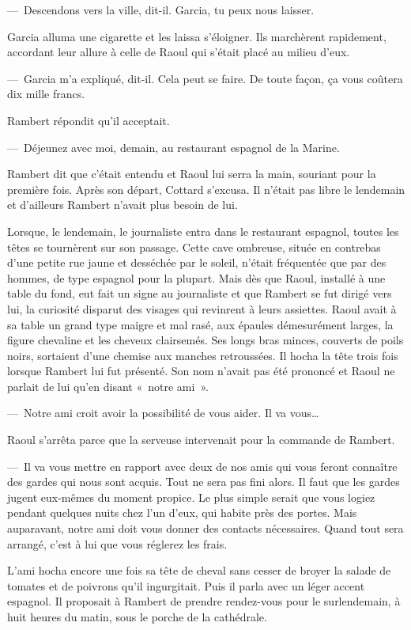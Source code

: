 \documentclass[french,twoside]{book} %
\begin{document}
— Descendons vers la ville, dit-il. Garcia, tu peux nous laisser.\par
Garcia alluma une cigarette et les laissa s’éloigner. Ils marchèrent rapidement, accordant leur allure à celle de Raoul qui s’était placé au milieu d’eux.\par
— Garcia m’a expliqué, dit-il. Cela peut se faire. De toute façon, ça vous coûtera dix mille francs.\par
Rambert répondit qu’il acceptait.\par
— Déjeunez avec moi, demain, au restaurant espagnol de la Marine.\par
Rambert dit que c’était entendu et Raoul lui serra la main, souriant pour la première fois. Après son départ, Cottard s’excusa. Il n’était pas libre le lendemain et d’ailleurs Rambert n’avait plus besoin de lui.\par
Lorsque, le lendemain, le journaliste entra dans le restaurant espagnol, toutes les têtes se tournèrent sur son passage. Cette cave ombreuse, située en contrebas d’une petite rue jaune et desséchée par le soleil, n’était fréquentée que par des hommes, de type espagnol pour la plupart. Mais dès que Raoul, installé à une table du fond, eut fait un signe au journaliste et que Rambert se fut dirigé vers lui, la curiosité disparut des visages qui revinrent à leurs assiettes. Raoul avait à sa table un grand type maigre et mal rasé, aux épaules démesurément larges, la figure chevaline et les cheveux clairsemés. Ses longs bras minces, couverts de poils noirs, sortaient d’une chemise aux manches retroussées. Il hocha la tête trois fois lorsque Rambert lui fut présenté. Son nom n’avait pas été prononcé et Raoul ne parlait de lui qu’en disant « notre ami ».\par
— Notre ami croit avoir la possibilité de vous aider. Il va vous…\par
Raoul s’arrêta parce que la serveuse intervenait pour la commande de Rambert.\par
— Il va vous mettre en rapport avec deux de nos amis qui vous feront connaître des gardes qui nous sont acquis. Tout ne sera pas fini alors. Il faut que les gardes jugent eux-mêmes du moment propice. Le plus simple serait que vous logiez pendant quelques nuits chez l’un d’eux, qui habite près des portes. Mais auparavant, notre ami doit vous donner des contacts nécessaires. Quand tout sera arrangé, c’est à lui que vous réglerez les frais.\par
L’ami hocha encore une fois sa tête de cheval sans cesser de broyer la salade de tomates et de poivrons qu’il ingurgitait. Puis il parla avec un léger accent espagnol. Il proposait à Rambert de prendre rendez-vous pour le surlendemain, à huit heures du matin, sous le porche de la cathédrale.\par
\end{document}
